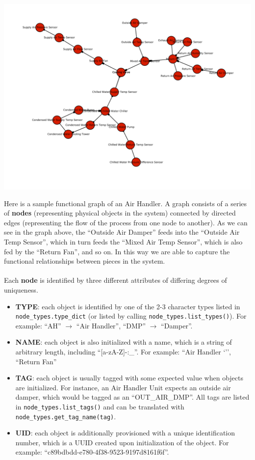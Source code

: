 \documentclass{article}
\begin{document}
\begin{center}
\includegraphics[scale=.8]{out.png}
\end{center}
Here is a sample functional graph of an Air Handler. A graph consists of a series of {\bf nodes} (representing physical objects in the system) connected by directed edges (representing the flow of the process from one node to another). As we can see in the graph above, the ``Outside Air Damper'' feeds into the ``Outside Air Temp Sensor'', which in turn feeds the ``Mixed Air Temp Sensor'', which is also fed by the ``Return Fan'', and so on. In this way we are able to capture the functional relationships between pieces in the system.
\\\\
Each {\bf node} is identified by three different attributes of differing degrees of uniqueness.
\begin{itemize}
	\item {\bf TYPE}: each object is identified by one of the 2-3 character types listed in \verb+node_types.type_dict+ (or listed by calling \verb+node_types.list_types()+). For example: ``AH'' $\rightarrow$ ``Air Handler'', ``DMP'' $\rightarrow$ ``Damper''.
	
	\item {\bf NAME}: each object is also initialized with a name, which is a string of arbitrary length, including ``[a-zA-Z]-:\_''. For example: ``Air Handler `'', ``Return Fan''
	
	\item {\bf TAG}: each object is usually tagged with some expected value when objects are initialized. For instance, an Air Handler Unit expects an outside air damper, which would be tagged as an ``OUT\_AIR\_DMP''. All tags are listed in \verb+node_types.list_tags()+ and can be translated with \verb+node_types.get_tag_name(tag)+.
	
	\item {\bf UID}: each object is additionally provisioned with a unique identification number, which is a UUID created upon initialization of the object. For example: ``c89bdbdd-e780-4f38-9523-9197d8161f6f''.
\end{itemize}
\end{document}
